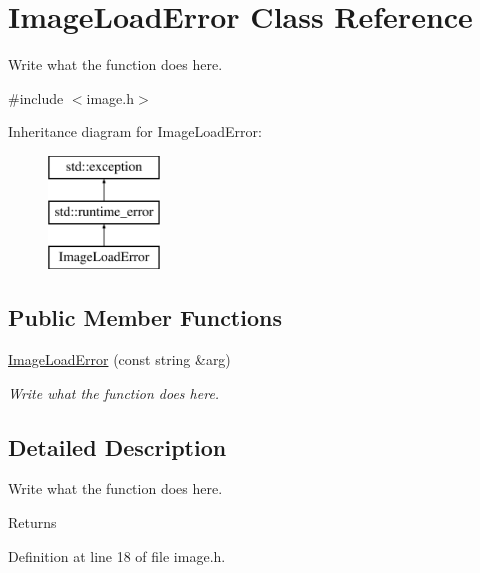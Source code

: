 \hypertarget{classImageLoadError}{\section{Image\+Load\+Error Class Reference}
\label{classImageLoadError}
}


Write what the function does here.  




{\ttfamily \#include $<$image.\+h$>$}

Inheritance diagram for Image\+Load\+Error\+:\begin{figure}[H]
\begin{center}
\leavevmode
\includegraphics[height=3.000000cm]{classImageLoadError}
\end{center}
\end{figure}
\subsection*{Public Member Functions}
\begin{DoxyCompactItemize}
\item 
\hyperlink{classImageLoadError_a578b21971e45108555b175a9638b388d}{Image\+Load\+Error} (const string \&arg)
\begin{DoxyCompactList}\small\item\em Write what the function does here. \end{DoxyCompactList}\end{DoxyCompactItemize}


\subsection{Detailed Description}
Write what the function does here. 

\begin{DoxyReturn}{Returns}

\end{DoxyReturn}


Definition at line 18 of file image.\+h.



